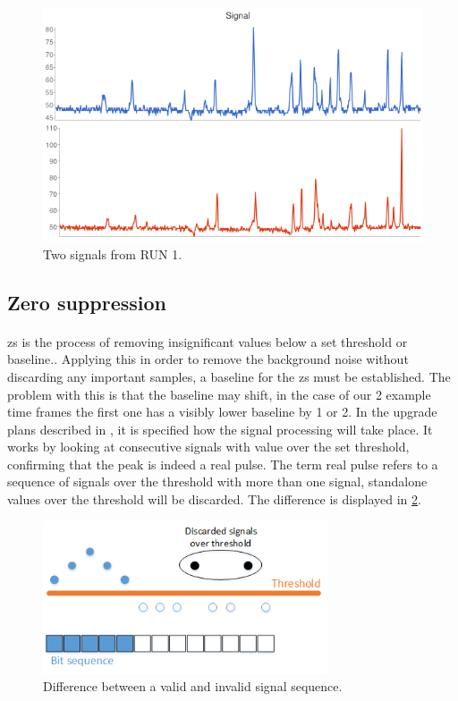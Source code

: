 \documentclass[a4paper, 12pt]{report}
\begin{document}
\begin{figure}[t]
	\centering
		\includegraphics[width=1.0\textwidth]{images/signal.png}
		\caption{Two signals from RUN 1.}
		\label{fig:signal}
\end{figure}

\subsection{Zero suppression} 
\label{subsec:zs}

\paragraph{}
\gls{zs} is the process of removing insignificant values below a set threshold or baseline.\cite{zerosuppression}.
Applying this in order to remove the background noise without discarding any important samples, a baseline for the \gls{zs} must be established.
The problem with this is that the baseline may shift, in the case of our 2 example time frames the first one has a visibly lower baseline by 1 or 2.
In the upgrade plans described in \cite{tdr-015}, it is specified how the signal processing will take place.
It works by looking at consecutive signals with value over the set threshold, confirming that the peak is indeed a real pulse.
The term real pulse refers to a sequence of signals over the threshold with more than one signal, standalone values over the threshold will be discarded.
The difference is displayed in \ref{fig:minseq}.

\begin{figure}[h!]
	\centering
		\includegraphics[width=0.75\textwidth]{images/minseq.png}
		\caption{Difference between a valid and invalid signal sequence.}
		\label{fig:minseq}
\end{figure}
\end{document}
